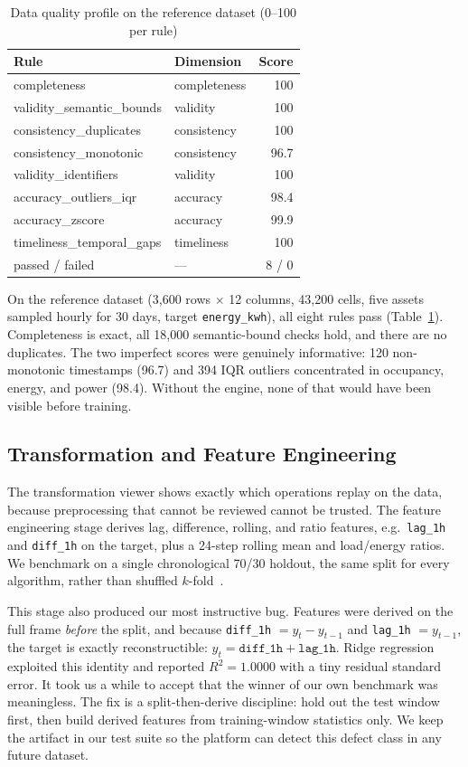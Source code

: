 \documentclass[conference]{IEEEtran}
\begin{document}
\begin{table}[!t]
\caption{Data quality profile on the reference dataset (0--100 per rule)}
\label{tab:dq}
\centering
\begin{tabular}{@{}llr@{}}
\toprule
Rule & Dimension & Score \\
\midrule
completeness & completeness & 100 \\
validity\_semantic\_bounds & validity & 100 \\
consistency\_duplicates & consistency & 100 \\
consistency\_monotonic & consistency & 96.7 \\
validity\_identifiers & validity & 100 \\
accuracy\_outliers\_iqr & accuracy & 98.4 \\
accuracy\_zscore & accuracy & 99.9 \\
timeliness\_temporal\_gaps & timeliness & 100 \\
\midrule
passed / failed & --- & 8 / 0 \\
\bottomrule
\end{tabular}
\end{table}

On the reference dataset (3,600 rows $\times$ 12 columns, 43,200 cells, five assets sampled hourly for 30 days, target \texttt{energy\_kwh}), all eight rules pass (Table~\ref{tab:dq}). Completeness is exact, all 18,000 semantic-bound checks hold, and there are no duplicates. The two imperfect scores were genuinely informative: 120 non-monotonic timestamps (96.7) and 394 IQR outliers concentrated in occupancy, energy, and power (98.4). Without the engine, none of that would have been visible before training.

\subsection{Transformation and Feature Engineering}\label{sec:feat}

The transformation viewer shows exactly which operations replay on the data, because preprocessing that cannot be reviewed cannot be trusted. The feature engineering stage derives lag, difference, rolling, and ratio features, e.g.\ \texttt{lag\_1h} and \texttt{diff\_1h} on the target, plus a 24-step rolling mean and load/energy ratios. We benchmark on a single chronological 70/30 holdout, the same split for every algorithm, rather than shuffled $k$-fold~\cite{bergmeir:2012, hyndman:2021}.

This stage also produced our most instructive bug. Features were derived on the full frame \emph{before} the split, and because \texttt{diff\_1h} $= y_t - y_{t-1}$ and \texttt{lag\_1h} $= y_{t-1}$, the target is exactly reconstructible: $y_t = \texttt{diff\_1h} + \texttt{lag\_1h}$. Ridge regression exploited this identity and reported $R^2 = 1.0000$ with a tiny residual standard error. It took us a while to accept that the winner of our own benchmark was meaningless. The fix is a split-then-derive discipline: hold out the test window first, then build derived features from training-window statistics only. We keep the artifact in our test suite so the platform can detect this defect class in any future dataset.
\end{document}
